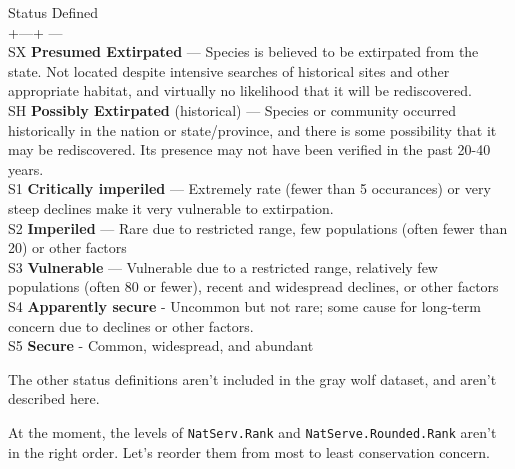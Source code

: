 \documentclass[]{article}
\newenvironment{Shaded}{\begin{snugshade}}{\end{snugshade}}
\newcommand{\CommentTok}[1]{\textcolor[rgb]{0.56,0.35,0.01}{\textit{#1}}}
\newcommand{\KeywordTok}[1]{\textcolor[rgb]{0.13,0.29,0.53}{\textbf{#1}}}
\newcommand{\NormalTok}[1]{#1}
\newcommand{\OperatorTok}[1]{\textcolor[rgb]{0.81,0.36,0.00}{\textbf{#1}}}
\begin{document}
Status \textbar{} Defined \textbar{}\\
+---+ \textbar{} --- \textbar{}\\
SX \textbar{} \textbf{Presumed Extirpated} --- Species is believed to be
extirpated from the state. Not located despite intensive searches of
historical sites and other appropriate habitat, and virtually no
likelihood that it will be rediscovered. \textbar{}\\
SH \textbar{} \textbf{Possibly Extirpated} (historical) --- Species or
community occurred historically in the nation or state/province, and
there is some possibility that it may be rediscovered. Its presence may
not have been verified in the past 20-40 years. \textbar{}\\
S1 \textbar{} \textbf{Critically imperiled} --- Extremely rate (fewer
than 5 occurances) or very steep declines make it very vulnerable to
extirpation. \textbar{}\\
S2 \textbar{} \textbf{Imperiled} --- Rare due to restricted range, few
populations (often fewer than 20) or other factors \textbar{}\\
S3 \textbar{} \textbf{Vulnerable} --- Vulnerable due to a restricted
range, relatively few populations (often 80 or fewer), recent and
widespread declines, or other factors \textbar{}\\
S4 \textbar{} \textbf{Apparently secure} - Uncommon but not rare; some
cause for long-term concern due to declines or other
factors.\textbar{}\\
S5 \textbar{} \textbf{Secure} - Common, widespread, and abundant
\textbar{}

The other status definitions aren't included in the gray wolf dataset,
and aren't described here.

\begin{Shaded}
\end{Shaded}

At the moment, the levels of \texttt{NatServ.Rank} and
\texttt{NatServe.Rounded.Rank} aren't in the right order. Let's reorder
them from most to least conservation concern.
\end{document}
